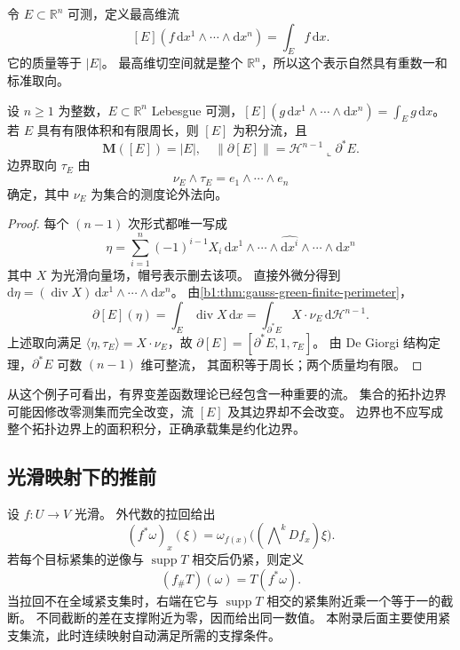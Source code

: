 令 \(E\subset\mathbb R^n\) 可测，定义最高维流
\[
 [E](f\,\mathrm{d}x^1\wedge\cdots\wedge \mathrm{d}x^n)=\int_E f\,\mathrm{d}x.
\]
它的质量等于 \(|E|\)。
最高维切空间就是整个 \(\mathbb R^n\)，所以这个表示自然具有重数一和标准取向。

\begin{proposition}\label{b1:prop:app-d-perimeter-current}
设 \(n\ge1\) 为整数，\(E\subset\mathbb R^n\) Lebesgue 可测，\([E](g\,\mathrm dx^1\wedge\cdots\wedge\mathrm dx^n)=\int_Eg\,\mathrm dx\)。若 \(E\) 具有有限体积和有限周长，则 \([E]\) 为积分流，且
\[
 \mathbf M([E])=|E|,\quad
 \|\partial[E]\|=\mathcal H^{n-1}\llcorner\partial^*E.
\]
边界取向 \(\tau_E\) 由
\[
 \nu_E\wedge\tau_E=e_1\wedge\cdots\wedge e_n
\]
确定，其中 \(\nu_E\) 为集合的测度论外法向。
\end{proposition}
\begin{proof}
每个 \((n-1)\) 次形式都唯一写成
\[
 \eta=\sum_{i=1}^n(-1)^{i-1}X_i\,
        \mathrm{d}x^1\wedge\cdots\wedge\widehat{\mathrm{d}x^i}\wedge\cdots\wedge \mathrm{d}x^n
\]
其中 \(X\) 为光滑向量场，帽号表示删去该项。
直接外微分得到 \(\mathrm{d}\eta=(\operatorname{div}X)\,\mathrm{d}x^1\wedge\cdots\wedge \mathrm{d}x^n\)。
由\cref{b1:thm:gauss-green-finite-perimeter}，
\[
 \partial[E](\eta)
   =\int_E\operatorname{div}X\,\mathrm{d}x
   =\int_{\partial^*E}X\cdot\nu_E\,\mathrm{d}\mathcal H^{n-1}.
\]
上述取向满足
\(\langle\eta,\tau_E\rangle=X\cdot\nu_E\)，故
\(\partial[E]=[\partial^*E,1,\tau_E]\)。
由 De Giorgi 结构定理，\(\partial^*E\) 可数 \((n-1)\) 维可整流，
其面积等于周长；两个质量均有限。
\end{proof}

从这个例子可看出，有界变差函数理论已经包含一种重要的流。
集合的拓扑边界可能因修改零测集而完全改变，流 \([E]\) 及其边界却不会改变。
边界也不应写成整个拓扑边界上的面积积分，正确承载集是约化边界。

\subsection{光滑映射下的推前}
\label{b1:subsec:D10303}

设 \(f:U\to V\) 光滑。
外代数的拉回给出
\[
 (f^*\omega)_x(\xi)
   =\omega_{f(x)}\bigl((\bigwedge\nolimits^kDf_x)\xi\bigr).
\]
若每个目标紧集的逆像与 \(\operatorname{supp}T\) 相交后仍紧，则定义
\[
 (f_\#T)(\omega)=T(f^*\omega).
\]
当拉回不在全域紧支集时，右端在它与 \(\operatorname{supp}T\) 相交的紧集附近乘一个等于一的截断。
不同截断的差在支撑附近为零，因而给出同一数值。
本附录后面主要使用紧支集流，此时连续映射自动满足所需的支撑条件。

